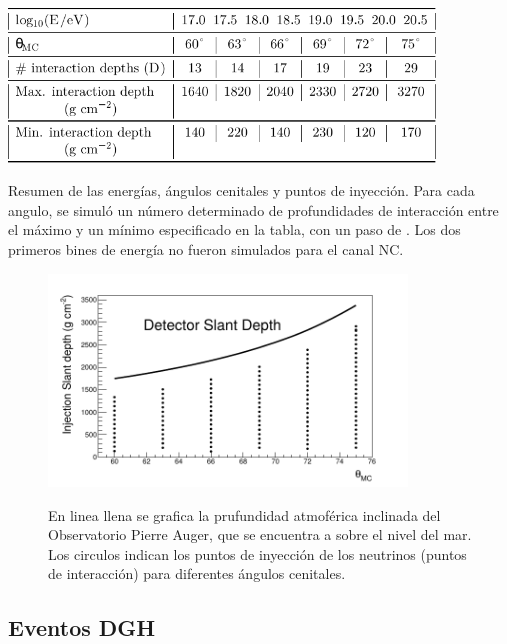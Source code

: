 		\begin{table}[ht]
			\begin{center}
			\includegraphics[width=0.85\textwidth]{fig/simulacionAuger/simShNavarro_1}
			\end{center}
			\caption{Resumen de las energías, ángulos cenitales y puntos de inyección. Para cada angulo, se simuló un número determinado de profundidades de interacción entre el máximo y un mínimo especificado en la tabla, con un paso de . Los dos primeros bines de energía no fueron simulados para el canal NC.
			}
			\label{tab:sim_table_dgl}
		\end{table}
		\begin{figure}[h!]
			\begin{center}
			\includegraphics[width=0.85\textwidth]{fig/simulacionAuger/simShNavarro_2}\\
			\caption{En linea llena se grafica la prufundidad atmoférica inclinada del Observatorio Pierre Auger, que se encuentra a  sobre el nivel del mar.
			Los circulos indican los puntos de inyección de los neutrinos (puntos de interacción) para diferentes ángulos cenitales.
			}
			\label{fig:sim_fig_dgl}
			\end{center}
		\end{figure}
		
		
		\subsection{Eventos DGH}
		
